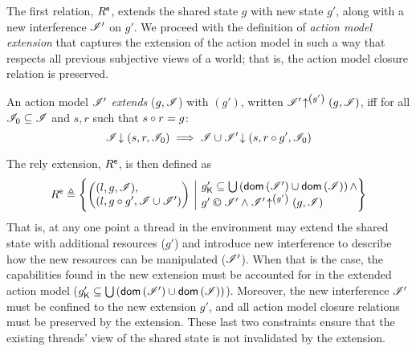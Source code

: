 The first relation, $R^{\textsf{e}}$, extends the shared state $g$ with new state $g'$, along with a new interference $\mathscr{I}'$ on $g'$. We proceed with the definition of \emph{action model extension} that captures the extension of the action model in such a way that respects all previous subjective views of a world; that is, the action model closure relation is preserved.
%
%
\begin{definition}\label{def:amodExtension}
An action model $\mathscr{I}'$ \emph{extends} ($g, \mathscr{I}$) with
$(g')$, written
$\mathscr{I}' \!\uparrow^{\left(g'\right)} \left(g, \mathscr{I}\right)$, iff for all
$\mathscr{I}_0 \subseteq \mathscr{I}$ and $s, r$ such that $s \circ r = g$:
\[
\mathscr{I} \!\downarrow \left(s, r, \mathscr{I}_0\right) \implies \mathscr{I} \cup \mathscr{I}' \!\downarrow \left(s, r\circ g', \mathscr{I}_0\right)
\]
\end{definition}
%
%
The rely extension, $R^{\textsf{e}}$, is then defined as
%
\[
  \extendR \eqdef
  \left\{
  \begin{array}{@{} l @{\hspace{5pt}} | @{\hspace{5pt}} l @{}}
    \left(
    \begin{array}{@{} l @{}}
      (l , g, \lmod),\\
      (l, g \composeL g', \lmod \cup \lmod')
    \end{array}
    \right)
    &
    \begin{array}{@{} l @{}}
      \capPart{g'} \containedIn \bigcup\left(\dom{\lmod'} \cup \dom{\lmod} \right)\land \\
      	g' \containI \lmod' \land
      \expandsAM{\lmod'}{g'}{g}{\lmod}
    \end{array}
  \end{array}
  \right\}
\]
%
That is, at any one point a thread in the environment may extend the shared state with additional resources ($g'$) and introduce new interference to describe how the new resources can be manipulated ($\mathscr{I}'$). When that is the case, the capabilities found in the new extension must be accounted for in the extended action model  ($g'_{\mathsf{K}} \subseteq \bigcup\left(\textsf{dom}\left( \mathscr{I}' \right) \cup \textsf{dom}\left( \mathscr{I} \right) \right)$). Moreover, the new interference $\mathscr{I}'$ must be confined to the new extension $g'$, and all action model closure relations must be preserved by the extension. These last two constraints ensure that the existing threads' view of the shared state is not invalidated by the extension.

